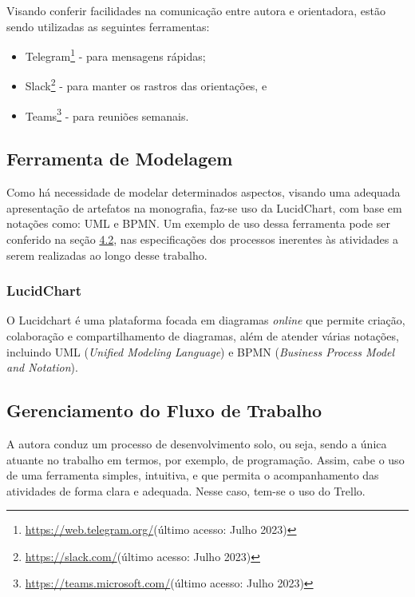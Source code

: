 \begin{description}
    \item Visando conferir facilidades na comunicação entre autora e orientadora, estão sendo utilizadas as seguintes ferramentas:
          \begin{itemize}
              \item Telegram\footnote{\url{https://web.telegram.org/}(último acesso: Julho 2023)} - para mensagens rápidas;

              \item Slack\footnote{\url{https://slack.com/}(último acesso: Julho 2023)} - para manter os rastros das orientações, e

              \item Teams\footnote{\url{https://teams.microsoft.com/}(último acesso: Julho 2023)} - para reuniões semanais.
          \end{itemize}
\end{description}

\subsection{Ferramenta de Modelagem}
\label{sec:Ferramenta de Modelagem}
Como há necessidade de modelar determinados aspectos, visando uma adequada apresentação de artefatos na monografia, faz-se uso da LucidChart, com base em notações como: UML e BPMN. Um exemplo de 
uso dessa ferramenta pode ser conferido na seção \hyperref[sec:Fluxo de Atividades]{4.2}, nas especificações dos processos inerentes às atividades a serem realizadas ao longo desse trabalho.

\subsubsection{LucidChart}
\label{sec:LucidChart}
O Lucidchart \cite{lucidchart} é uma plataforma focada em diagramas \textit{online} que permite criação, colaboração e compartilhamento de diagramas, além de atender várias notações, incluindo UML (\textit{Unified Modeling Language}) 
e BPMN (\textit{Business Process Model and Notation}).

\subsection{Gerenciamento do Fluxo de Trabalho}
\label{sec:Gerenciamento do Fluxo de Trabalho}
A autora conduz um processo de desenvolvimento solo, ou seja, sendo a única atuante no trabalho em termos, por exemplo, de programação. Assim, cabe o uso de uma ferramenta simples, intuitiva, e que 
permita o acompanhamento das atividades de forma clara e adequada. Nesse caso, tem-se o uso do Trello.

